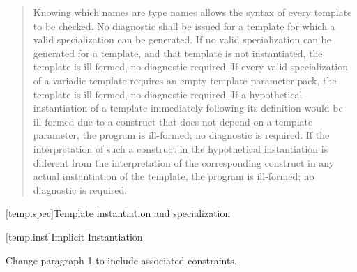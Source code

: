 \begin{quote}
\setcounter{Paras}{7}
\pnum
Knowing which names are type names allows the syntax of every
template to be checked. No diagnostic shall be issued for a template
for which a valid specialization can be generated. If no valid
specialization can be generated for a template, and that template is
not instantiated, the template is ill-formed, no diagnostic
required. If every valid specialization of a variadic template
requires an empty template parameter pack, the template is
ill-formed, no diagnostic required. 
% 
% 
% 
If a hypothetical instantiation of a template immediately following
its definition would be ill-formed due to a construct that does not
depend on a template parameter, the program is ill-formed; no
diagnostic is required. If the interpretation of such a construct in
the hypothetical instantiation is different from the interpretation
of the corresponding construct in any actual instantiation of the
template, the program is ill-formed; no diagnostic is required.
\end{quote}

[temp.spec]{Template instantiation and specialization}

[temp.inst]{Implicit Instantiation}
    
Change paragraph 1 to include associated constraints.

